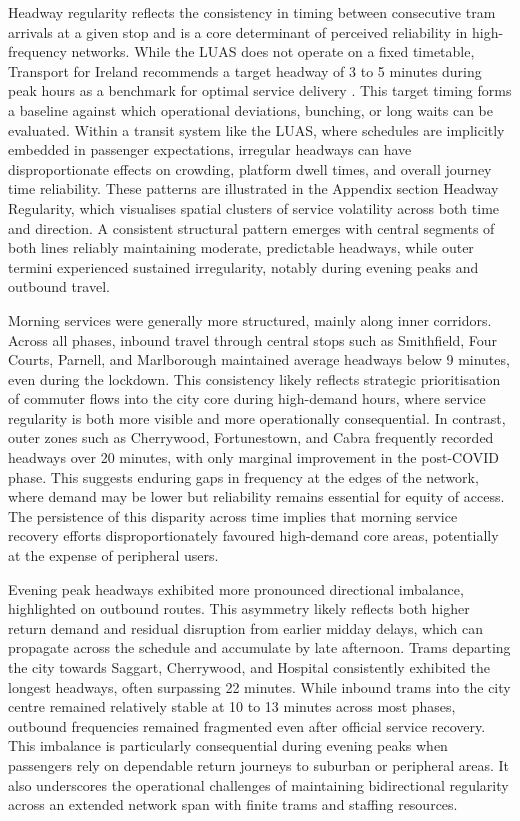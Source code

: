     Headway regularity reflects the consistency in timing between consecutive tram arrivals at a given stop and is a core determinant of perceived reliability in high-frequency networks. While the LUAS does not operate on a fixed timetable, Transport for Ireland recommends a target headway of 3 to 5 minutes during peak hours as a benchmark for optimal service delivery  \parencite{tii_luas}. This target timing forms a baseline against which operational deviations, bunching, or long waits can be evaluated. Within a transit system like the LUAS, where schedules are implicitly embedded in passenger expectations, irregular headways can have disproportionate effects on crowding, platform dwell times, and overall journey time reliability. These patterns are illustrated in the Appendix section Headway Regularity, which visualises spatial clusters of service volatility across both time and direction. A consistent structural pattern emerges with central segments of both lines reliably maintaining moderate, predictable headways, while outer termini experienced sustained irregularity, notably during evening peaks and outbound travel.

    Morning services were generally more structured, mainly along inner corridors. Across all phases, inbound travel through central stops such as Smithfield, Four Courts, Parnell, and Marlborough maintained average headways below 9 minutes, even during the lockdown. This consistency likely reflects strategic prioritisation of commuter flows into the city core during high-demand hours, where service regularity is both more visible and more operationally consequential. In contrast, outer zones such as Cherrywood, Fortunestown, and Cabra frequently recorded headways over 20 minutes, with only marginal improvement in the post-COVID phase. This suggests enduring gaps in frequency at the edges of the network, where demand may be lower but reliability remains essential for equity of access. The persistence of this disparity across time implies that morning service recovery efforts disproportionately favoured high-demand core areas, potentially at the expense of peripheral users.

    Evening peak headways exhibited more pronounced directional imbalance, highlighted on outbound routes. This asymmetry likely reflects both higher return demand and residual disruption from earlier midday delays, which can propagate across the schedule and accumulate by late afternoon. Trams departing the city towards Saggart, Cherrywood, and Hospital consistently exhibited the longest headways, often surpassing 22 minutes. While inbound trams into the city centre remained relatively stable at 10 to 13 minutes across most phases, outbound frequencies remained fragmented even after official service recovery. This imbalance is particularly consequential during evening peaks when passengers rely on dependable return journeys to suburban or peripheral areas. It also underscores the operational challenges of maintaining bidirectional regularity across an extended network span with finite trams and staffing resources.

